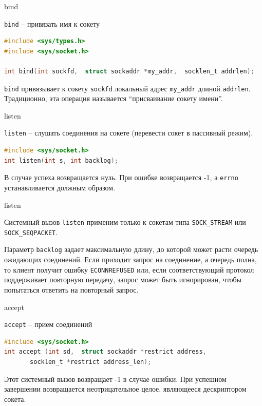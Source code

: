 \begin{frame}[fragile]{bind}

{\tt bind} -- привязать имя к сокету
\scriptsize\begin{lstlisting}[language=C]
#include <sys/types.h>
#include <sys/socket.h>

int bind(int sockfd,  struct sockaddr *my_addr,  socklen_t addrlen);
\end{lstlisting}
{\tt bind} привязывает  к  сокету  {\tt sockfd} локальный адрес {\tt my\_addr} длиной {\tt addrlen}.  Традиционно, эта операция называется ``присваивание сокету имени''.
\end{frame}

\begin{frame}[fragile]{listen}

{\tt listen} -- слушать соединения на сокете (перевести сокет в пассивный режим).

\scriptsize\begin{lstlisting}[language=C]
#include <sys/socket.h> 
int listen(int s, int backlog);   
\end{lstlisting}
В случае успеха возвращается нуль. 
При ошибке возвращается -1, а {\tt errno} устанавливается должным образом.
\end{frame}

\begin{frame}{listen}

Системный вызов {\tt listen} применим 
только к сокетам типа {\tt SOCK\_STREAM} или {\tt SOCK\_SEQPACKET}.

Параметр {\tt backlog} задает максимальную длину, до которой может расти очередь 
ожидающих соединений. Если приходит запрос на соединение, а очередь полна,
то клиент получит ошибку {\tt ECONNREFUSED} или, если соответствующий
протокол поддерживает повторную передачу, запрос может быть игнорирован,
чтобы попытаться ответить на повторный запрос.   
\end{frame}

\begin{frame}[fragile]{accept}

{\tt accept} -- прием соединений
\scriptsize\begin{lstlisting}[language=C]
#include <sys/socket.h>
int accept (int sd,  struct sockaddr *restrict address, 
       socklen_t *restrict address_len);
\end{lstlisting}
Этот системный вызов возвращает -1 в случае  ошибки.   При  успешном  завершении  возвращается  неотрицательное целое,  являющееся дескриптором сокета.
\end{frame}

